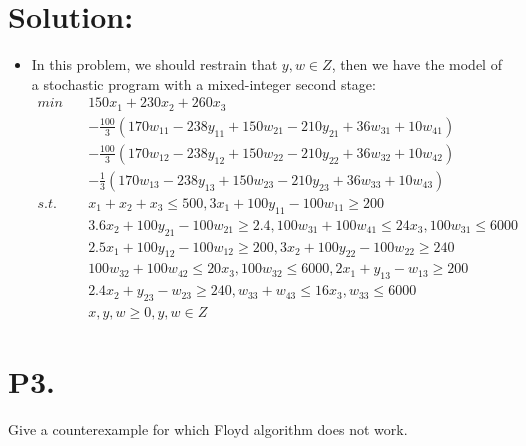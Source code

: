 \documentclass{article}
\theoremstyle{definition}
\theoremstyle{definition}
\theoremstyle{remark}
\begin{document}
\section*{Solution:}
\begin{itemize}
\item In this problem, we should restrain that $y,w\in Z$, then we have the model of a stochastic program with a mixed-integer second stage:
\begin{equation}
\begin{aligned}
min \quad &150x_1+230x_2+260x_3 \\
&-\frac{100}{3}(170w_{11}-238y_{11}+150w_{21}-210y_{21}+36w_{31}+10w_{41})\\
&-\frac{100}{3}(170w_{12}-238y_{12}+150w_{22}-210y_{22}+36w_{32}+10w_{42})\\
&-\frac{1}{3}(170w_{13}-238y_{13}+150w_{23}-210y_{23}+36w_{33}+10w_{43})\\
s.t. \quad &x_1+x_2+x_3\leq500, 3x_1+100y_{11}-100w_{11}\geq200 \\
&3.6x_2+100y_{21}-100w_{21}\geq 2.4, 100w_{31}+100w_{41}\leq24x_3,100w_{31}\leq6000 \\
&2.5x_1+100y_{12}-100w_{12}\geq200, 3x_2+100y_{22}-100w_{22}\geq240 \\               
&100w_{32}+100w_{42}\leq20x_3, 100w_{32}\leq6000,2x_1+y_{13}-w_{13}\geq200 \\   
&2.4x_2+y_{23}-w_{23}\geq240, w_{33}+w_{43}\leq16x_3,w_{33}\leq6000 \\
&x,y,w\geq0,y,w\in Z
\end{aligned}
\end{equation}
\end{itemize}


\section*{P3.}
Give a counterexample for which Floyd algorithm does not work.
\end{document}
